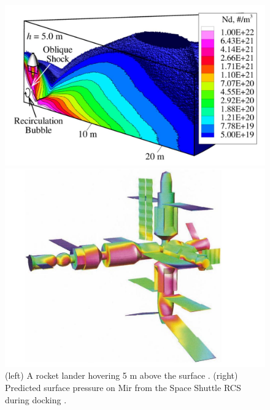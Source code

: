 \begin{figure}
    \centering
  \begin{minipage}[b]{0.49\textwidth}
    \includegraphics[width=\textwidth]{figures/hover_rocket.JPG}
  \end{minipage} %
  \begin{minipage}[b]{0.49\textwidth}
    \includegraphics[width=\textwidth]{figures/mir_shuttle.JPG}

  \end{minipage}
  \caption[DSMC Application Examples]{(left) A rocket lander hovering 5 m above the surface \cite{hover_rocket}. (right) Predicted surface pressure on Mir from the Space Shuttle RCS during docking \cite{mir_shuttle}.}
  \label{fig:dsmc_application}
\end{figure}

